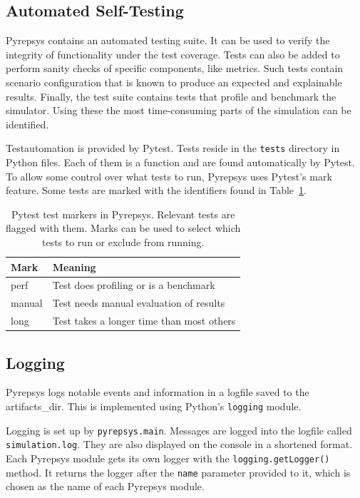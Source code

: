 \documentclass[%
    ]{\PathToTumTemplate/thesis/tum_thesis}
\begin{document}
\subsection{Automated Self-Testing}
Pyrepsys contains an automated testing suite.
It can be used to verify the integrity of functionality under the test coverage.
Tests can also be added to perform sanity checks of specific components, like metrics.
Such tests contain scenario configuration that is known to produce an expected and explainable results.
Finally, the test suite contains tests that profile and benchmark the simulator.
Using these the most time-consuming parts of the simulation can be identified.

Testautomation is provided by Pytest.
Tests reside in the \texttt{tests} directory in Python files.
Each of them is a function and are found automatically by Pytest.
To allow some control over what tests to run, Pyrepsys uses Pytest's mark feature.
Some tests are marked with the identifiers found in Table~\ref{tab:pytest_marks}.

\begin{table}[tbp]
\centering
\begin{tabular}{ll}
\toprule
\textbf{Mark}        & \textbf{Meaning} \\ \midrule
perf       & Test does profiling or is a benchmark \\
manual     & Test needs manual evaluation of results \\
long       & Test takes a longer time than most others \\
\bottomrule
\end{tabular}
\caption{
	Pytest test markers in Pyrepsys.
	Relevant tests are flagged with them.
	Marks can be used to select which tests to run or exclude from running.
}
\label{tab:pytest_marks}
\end{table}


\subsection{Logging}
Pyrepsys logs notable events and information in a logfile saved to the \gls{artifacts_dir}.
This is implemented using Python's \lstinline{logging} module.

Logging is set up by \texttt{pyrepsys.main}.
Messages are logged into the logfile called \texttt{simulation.log}.
They are also displayed on the console in a shortened format.
Each Pyrepsys module gets its own logger with the \lstinline{logging.getLogger()} method.
It returns the logger after the \texttt{name} parameter provided to it, which is chosen as the name of each Pyrepsys module.
\end{document}

